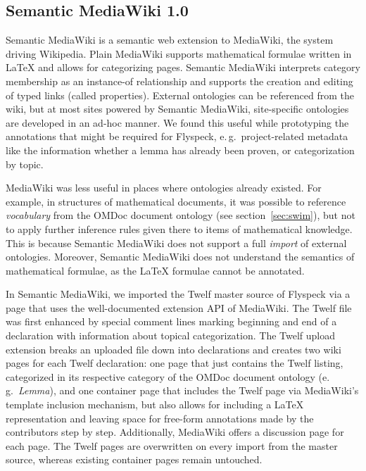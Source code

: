 \subsection{Semantic MediaWiki 1.0}
\label{sec:smw-study}

Semantic MediaWiki\cite{KrSchVr:semwiki-reasoning07} is a semantic web
extension to MediaWiki, the system driving Wikipedia.  Plain MediaWiki
supports mathematical formulae written in {\LaTeX} and allows for
categorizing pages.  Semantic MediaWiki interprets category membership
as an instance-of relationship and supports the creation and editing
of typed links (called properties).  External ontologies can be
referenced from the wiki, but at most   sites powered by Semantic
MediaWiki, site-specific ontologies are developed in an ad-hoc manner.
We found this useful while prototyping the annotations that might be
required for Flyspeck, e.\,g.\ project-related metadata like the
information whether a lemma has already been proven, or categorization
by topic.  

MediaWiki was less useful in places where ontologies
already existed.  For example, in structures of mathematical
documents, it was possible to reference \emph{vocabulary} from the
OMDoc document ontology (see section~\ref{sec:swim}), but not to apply
further inference rules given there to items of mathematical
knowledge.  This is because Semantic MediaWiki does not support a full
\emph{import} of external ontologies.  Moreover, Semantic MediaWiki does
not understand the semantics of mathematical formulae, as the {\LaTeX}
formulae cannot be annotated.

In Semantic MediaWiki, we imported the Twelf master source of Flyspeck
via a page that uses the well-documented
extension API of MediaWiki.  The Twelf file was first enhanced by
special comment lines marking beginning and end of a
declaration with information about topical
categorization.  The Twelf upload extension breaks an uploaded file
down into declarations and creates two wiki pages for each Twelf
declaration: one page that just contains the Twelf listing,
categorized in its respective category of the OMDoc document ontology
(e.\,g.\ \textit{Lemma}), and one container page that includes the
Twelf page via MediaWiki's template inclusion mechanism, but also
allows for including a {\LaTeX} representation and leaving space for
free-form annotations made by the contributors step by step.
Additionally, MediaWiki offers a discussion page for each page.  The
Twelf pages are overwritten on every import from the master source,
whereas existing container pages remain untouched.

